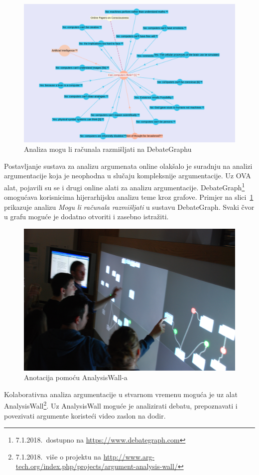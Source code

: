 \begin{figure}
\centering
\includegraphics[scale=0.4]{debategraph.png}
\caption{Analiza mogu li računala razmišljati na DebateGraphu}
\label{fig:computers}
\end{figure}

Postavljanje sustava za analizu argumenata online olakšalo je suradnju 
na analizi argumentacije koja je neophodna u slučaju kompleksnije
argumentacije. Uz OVA alat, pojavili su se i drugi online alati za
analizu argumentacije. DebateGraph\footnote{7.1.2018.\ dostupno na 
\url{https://www.debategraph.com}} omogućava korisnicima hijerarhijsku 
analizu teme kroz grafove. Primjer na slici~\ref{fig:computers} prikazuje
analizu \emph{Mogu li računala razmišljati} u sustavu DebateGraph. Svaki
čvor u grafu moguće je dodatno otvoriti i zasebno istražiti. 

\begin{figure}
\centering
\includegraphics[scale=0.4]{analysis_wall.jpg}
\caption{Anotacija pomoću AnalysisWall-a}
\label{fig:analysiswall}
\end{figure}

Kolaborativna analiza argumentacije u stvarnom vremenu moguća je uz alat 
AnalysisWall\footnote{7.1.2018.\ više o projektu na \url{http://www.arg-tech.org/index.php/projects/argument-analysis-wall/}}.
Uz AnalysisWall moguće je analizirati debatu, prepoznavati i povezivati argumente 
koristeći video zaslon na dodir. 
